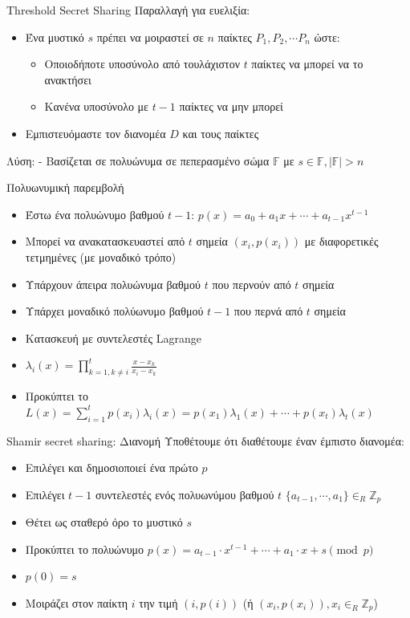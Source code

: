 \documentclass[handout]{beamer}
\begin{document}
\begin{frame}{Threshold Secret Sharing}
Παραλλαγή για ευελιξία: 
\begin{itemize}
\item Ένα μυστικό $s$ πρέπει να μοιραστεί σε $n$ παίκτες $P_1, P_2, \cdots P_n$ ώστε:
\pause
\begin{itemize}
\item Οποιοδήποτε υποσύνολο από τουλάχιστον $t$ παίκτες να μπορεί να το ανακτήσει
\pause
\item Κανένα υποσύνολο με $t-1$ παίκτες να μην μπορεί
\pause
\end{itemize}
\item {} Εμπιστευόμαστε τον διανομέα $D$ και τους παίκτες
\end{itemize}
Λύση:  - Βασίζεται σε πολυώνυμα σε πεπερασμένο σώμα $\mathbb{F}$ με $s \in \mathbb{F}, |\mathbb{F}|>n$
\end{frame}

\begin{frame}{Πολυωνυμική παρεμβολή}
\begin{itemize}
\item Έστω ένα πολυώνυμο βαθμού $t-1$: $p(x) = a_0+a_1x+\cdots+a_{t-1}x^{t-1}$ \pause
\item Μπορεί να ανακατασκευαστεί από $t$ σημεία $(x_i,p(x_i))$ με διαφορετικές τετμημένες (με μοναδικό τρόπο) \pause
\item Υπάρχουν άπειρα πολυώνυμα βαθμού $t$ που περνούν από $t$ σημεία \pause
\item Υπάρχει μοναδικό πολύωνυμο βαθμού $t-1$ που περνά από $t$ σημεία \pause
\item Κατασκευή με συντελεστές Lagrange \pause
\item $\lambda_i(x) = \prod_{k=1, k \neq i}^t \frac{x-x_k}{x_i-x_k}$ \pause
\item Προκύπτει το $L(x) = \sum_{i=1}^t p(x_i) \lambda_i(x) = p(x_1) \lambda_1(x) + \cdots + p(x_{t}) \lambda_{t} (x) $ 
\end{itemize}
\end{frame}
 

\begin{frame}{Shamir secret sharing: Διανομή}
Υποθέτουμε ότι διαθέτουμε έναν έμπιστο διανομέα:
\begin{itemize}
\item Επιλέγει και δημοσιοποιεί ένα πρώτο $p$ \pause
\item Επιλέγει $t-1$ συντελεστές ενός πολυωνύμου βαθμού $t$ $\{a_{t-1}, \cdots, a_1 \} \in_R \mathbb{Z}_p$ \pause
\item Θέτει ως σταθερό όρο το μυστικό $s$ \pause
\item Προκύπτει το πολυώνυμο $p(x) = a_{t-1} \cdot x^{t-1} +  \cdots + a_{1} \cdot x + s \pmod{p}$ \pause
\item $p(0)=s$ \pause
\item Μοιράζει στον παίκτη $i$ την τιμή $(i,p(i))$ (ή $(x_i,p(x_i)), x_i \in_R \mathbb{Z}_p$)
\end{itemize}
\end{frame}
\end{document}
